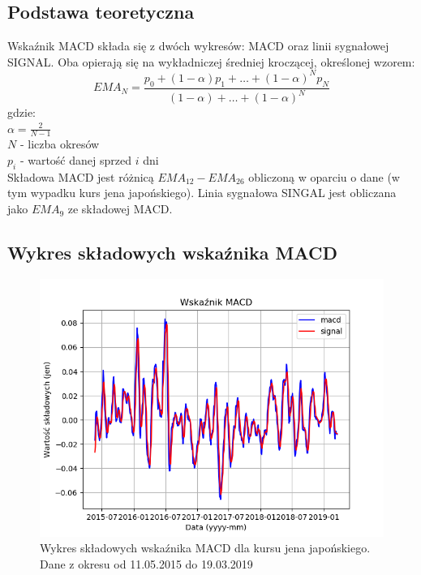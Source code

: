 \documentclass{article} %
\begin{document}
\subsection{Podstawa teoretyczna}
Wskaźnik MACD składa się z dwóch wykresów: MACD oraz linii sygnałowej SIGNAL. 
Oba opierają się na wykładniczej średniej kroczącej, określonej wzorem: \\
\begin{equation}
    EMA_{N} = \frac{p_{0} + (1-\alpha)p_{1} + \dots + (1-\alpha)^N p_{N}}{(1-\alpha) + \dots + (1-\alpha)^N}
\end{equation}
gdzie: \\ \newline
$ \alpha = \frac{2}{N - 1} $ \\
$ N $ - liczba okresów \\
$ p_{i} $ - wartość danej sprzed $ i $ dni \\


Składowa MACD jest różnicą $ EMA_{12} - EMA_{26} $ obliczoną w oparciu o dane (w tym wypadku kurs jena japońskiego). 
Linia sygnałowa SINGAL jest obliczana jako $ EMA_{9} $ ze składowej MACD.

\subsection{Wykres składowych wskaźnika MACD}

\begin{figure}[h]
    \centering
    \includegraphics[scale=0.7]{images/wykres_macd.png}
    \caption{Wykres składowych wskaźnika MACD dla kursu jena japońskiego. Dane z okresu od 11.05.2015 do 19.03.2019}
\end{figure}
\end{document}
